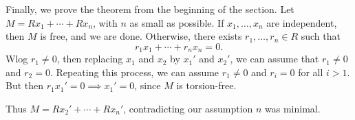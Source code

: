 \documentclass[12pt]{article}
\theoremstyle{definition}
\theoremstyle{remark}
\begin{document}
Finally, we prove the theorem from the beginning of the section. Let $M = Rx_1 + \cdots + Rx_n$, with $n$ as small as possible. If $x_1, \ldots, x_n$ are independent, then $M$ is free, and we are done. Otherwise, there exists $r_1, \ldots, r_n \in R$ such that
\[
r_1x_1 + \cdots + r_nx_n = 0
.\]
Wlog $r_1 \neq 0$, then replacing $x_1$ and $x_2$ by $x_1'$ and $x_2'$, we can assume that $r_1 \neq 0$ and $r_2 = 0$. Repeating this process, we can assume $r_1 \neq 0$ and $r_i = 0$ for all $i > 1$. But then $r_1x_1' = 0 \implies x_1' = 0$, since $M$ is torsion-free.

Thus $M = Rx_2' + \cdots + Rx_n'$, contradicting our assumption $n$ was minimal.

\newpage

\printindex
\end{document}
